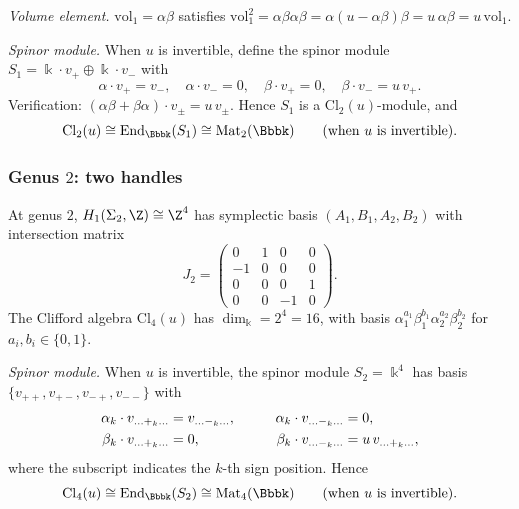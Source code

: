 \emph{Volume element.}\;
$\mathrm{vol}_1 = \alpha\beta$ satisfies
$\mathrm{vol}_1^2 = \alpha\beta\alpha\beta =
\alpha(u - \alpha\beta)\beta = u\,\alpha\beta = u\,\mathrm{vol}_1$.

\emph{Spinor module.}\;
When $u$ is invertible, define the spinor module
$S_1 = \Bbbk \cdot v_+ \oplus \Bbbk \cdot v_-$ with
\begin{equation}%
\alpha \cdot v_+ = v_-,
\quad
\alpha \cdot v_- = 0,
\quad
\beta \cdot v_+ = 0,
\quad
\beta \cdot v_- = u\, v_+.
\end{equation}
Verification: $(\alpha\beta + \beta\alpha) \cdot v_\pm =
u\, v_\pm$. Hence $S_1$ is a $\mathrm{Cl}_2(u)$-module, and
\begin{equation}%
\mathrm{Cl}_2(u) \cong \End_\Bbbk(S_1)
\cong \mathrm{Mat}_2(\Bbbk)
\qquad\text{(when $u$ is invertible).}
\end{equation}

\subsubsection{Genus $2$: two handles}

At genus $2$, $H_1(\Sigma_2, \Z) \cong \Z^4$ has symplectic basis
$(A_1, B_1, A_2, B_2)$ with intersection matrix
\[
J_2 = \begin{pmatrix}
0 & 1 & 0 & 0 \\
-1 & 0 & 0 & 0 \\
0 & 0 & 0 & 1 \\
0 & 0 & -1 & 0
\end{pmatrix}.
\]
The Clifford algebra $\mathrm{Cl}_4(u)$ has
$\dim_\Bbbk = 2^4 = 16$, with basis
$\alpha_1^{a_1}\beta_1^{b_1}\alpha_2^{a_2}\beta_2^{b_2}$
for $a_i, b_i \in \{0,1\}$.

\emph{Spinor module.}\;
When $u$ is invertible, the spinor module $S_2 = \Bbbk^4$ has
basis $\{v_{++}, v_{+-}, v_{-+}, v_{--}\}$ with
\begin{alignat}{2}
\alpha_k \cdot v_{\ldots+_k\ldots}
 &= v_{\ldots-_k\ldots},
&\qquad
\alpha_k \cdot v_{\ldots-_k\ldots}
 &= 0, \notag \\
\beta_k \cdot v_{\ldots+_k\ldots}
 &= 0,
&\qquad
\beta_k \cdot v_{\ldots-_k\ldots}
 &= u\, v_{\ldots+_k\ldots}, %
\end{alignat}
where the subscript indicates the $k$-th sign position. Hence
\begin{equation}%
\mathrm{Cl}_4(u) \cong \End_\Bbbk(S_2)
\cong \mathrm{Mat}_4(\Bbbk)
\qquad\text{(when $u$ is invertible).}
\end{equation}

